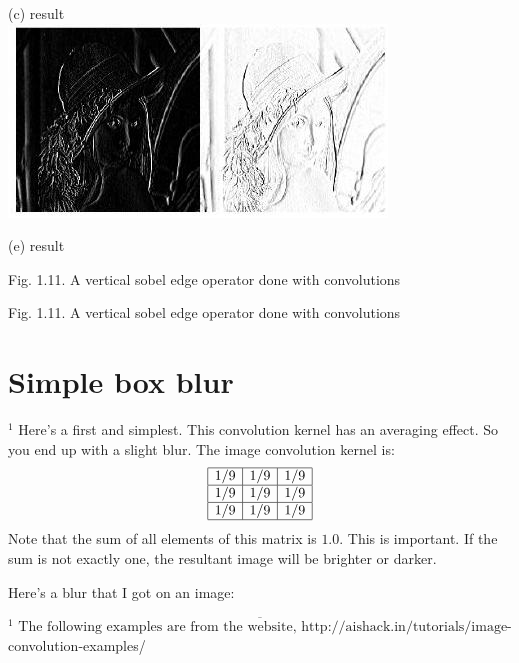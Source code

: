 \documentclass[10pt]{article}
\begin{document}
(c) result\\

\includegraphics[max width=\textwidth]{2022_01_06_b5ce182ed1bd5f482e5bg-18(4)}

(e) result

Fig. 1.11. A vertical sobel edge operator done with convolutions

Fig. 1.11. A vertical sobel edge operator done with convolutions

\section{Simple box blur}
${ }^{1}$ Here's a first and simplest. This convolution kernel has an averaging effect. So you end up with a slight blur. The image convolution kernel is:
$$
\begin{array}{|l|l|l|}
\hline 1 / 9 & 1 / 9 & 1 / 9 \\
\hline 1 / 9 & 1 / 9 & 1 / 9 \\
\hline 1 / 9 & 1 / 9 & 1 / 9 \\
\hline
\end{array}
$$
Note that the sum of all elements of this matrix is $1.0$. This is important. If the sum is not exactly one, the resultant image will be brighter or darker.

Here's a blur that I got on an image:

$\overline{{ }^{1} \text { The following examples are from the website, http://aishack.in/tutorials/image- }}$ convolution-examples/
\end{document}
